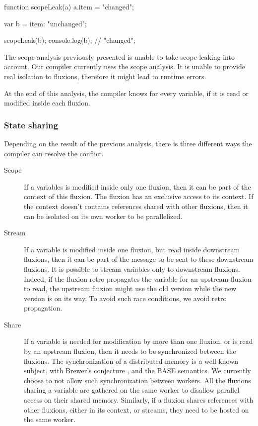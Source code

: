 \begin{code}[js, caption={Example of a simple scope leak},label={lst:scopeleak}]
function scopeLeak(a)
{
  a.item = "changed";
}

var b = {item: "unchanged"};

scopeLeak(b);
console.log(b); // "changed";
\end{code}

The scope analysis previously presented is unable to take scope leaking into account.
Our compiler currently uses the scope analysis.
It is unable to provide real isolation to fluxions, therefore it might lead to runtime errors.

At the end of this analysis, the compiler knows for every variable, if it is read or modified inside each fluxion.

\subsubsection{State sharing}

Depending on the result of the previous analysis, there is three different ways the compiler can resolve the conflict.

\begin{description}
\item[Scope]
If a variables is modified inside only one fluxion, then it can be part of the context of this fluxion.
The fluxion has an exclusive access to its context.
If the context doesn't contains references shared with other fluxions, then it can be isolated on its own worker to be parallelized.

\item[Stream]
If a variable is modified inside one fluxion, but read inside downstream fluxions, then it can be part of the message to be sent to these downstream fluxions.
It is possible to stream variables only to downstream fluxions.
Indeed, if the fluxion retro propagates the variable for an upstream fluxion to read, the upstream fluxion might use the old version while the new version is on its way.
To avoid such race conditions, we avoid retro propagation.

\item[Share]
If a variable is needed for modification by more than one fluxion, or is read by an upstream fluxion, then it needs to be synchronized between the fluxions.
The synchronization of a distributed memory is a well-known subject, with Brewer's conjecture \cite{Gilbert2002, codahale2010}, and the BASE semantics\cite{Fox1997}.
We currently choose to not allow such synchronization between workers.
All the fluxions sharing a variable are gathered on the same worker to disallow parallel access on their shared memory.
Similarly, if a fluxion shares references with other fluxions, either in its context, or streams, they need to be hosted on the same worker.
\end{description}


